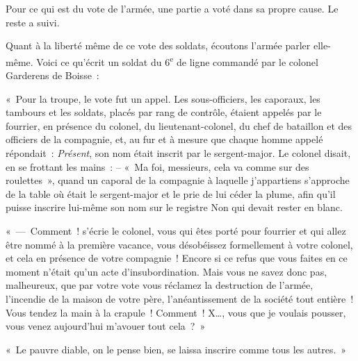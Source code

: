 \documentclass[french,twoside]{book} %
\newenvironment{quoteblock}%
  {\begin{quoting}}
  {\end{quoting}}
\newenvironment{quotebar}{%
    \def\FrameCommand{{\color{rubric!10!}\vrule width 0.5em} \hspace{0.9em}}%
    \def\OuterFrameSep{\itemsep} %
    \MakeFramed {\advance\hsize-\width \FrameRestore}
  }%
  {%
    \endMakeFramed
  }
\renewenvironment{quoteblock}%
  {%
    \savenotes
    \setstretch{0.9}
    \normalfont
    \begin{quotebar}
  }
  {%
    \end{quotebar}
    \spewnotes
  }
\begin{document}
Pour ce qui est du vote de l’armée, une partie a voté dans sa propre cause. Le reste a suivi.\par
Quant à la liberté même de ce vote des soldats, écoutons l’armée parler elle-même. Voici ce qu’écrit un soldat du 6\textsuperscript{e} de ligne commandé par le colonel Garderens de Boisse :\par
« Pour la troupe, le vote fut un appel. Les sous-officiers, les caporaux, les tambours et les soldats, placés par rang de contrôle, étaient appelés par le fourrier, en présence du colonel, du lieutenant-colonel, du chef de bataillon et des officiers de la compagnie, et, au fur et à mesure que chaque homme appelé répondait : \emph{Présent}, son nom était inscrit par le sergent-major. Le colonel disait, en se frottant les mains : – « Ma foi, messieurs, cela va comme sur des roulettes », quand un caporal de la compagnie à laquelle j’appartiens s’approche de la table où était le sergent-major et le prie de lui céder la plume, afin qu’il puisse inscrire lui-même son nom sur le registre Non qui devait rester en blanc.\par

\begin{quoteblock}
 \noindent « — Comment ! s’écrie le colonel, vous qui êtes porté pour fourrier et qui allez être nommé à la première vacance, vous désobéissez formellement à votre colonel, et cela en présence de votre compagnie ! Encore si ce refus que vous faites en ce moment n’était qu’un acte d’insubordination. Mais vous ne savez donc pas, malheureux, que par votre vote vous réclamez la destruction de l’armée, l’incendie de la maison de votre père, l’anéantissement de la société tout entière ! Vous tendez la main à la crapule ! Comment ! X…, vous que je voulais pousser, vous venez aujourd’hui m’avouer tout cela ? »\par
 « Le pauvre diable, on le pense bien, se laissa inscrire comme tous les autres. »
 \end{quoteblock}
\end{document}
